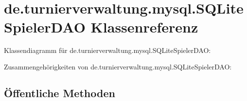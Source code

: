 \hypertarget{classde_1_1turnierverwaltung_1_1mysql_1_1_s_q_lite_spieler_d_a_o}{}\section{de.\+turnierverwaltung.\+mysql.\+S\+Q\+Lite\+Spieler\+D\+AO Klassenreferenz}
\label{classde_1_1turnierverwaltung_1_1mysql_1_1_s_q_lite_spieler_d_a_o}


Klassendiagramm für de.\+turnierverwaltung.\+mysql.\+S\+Q\+Lite\+Spieler\+D\+AO\+:


Zusammengehörigkeiten von de.\+turnierverwaltung.\+mysql.\+S\+Q\+Lite\+Spieler\+D\+AO\+:
\subsection*{Öffentliche Methoden}
